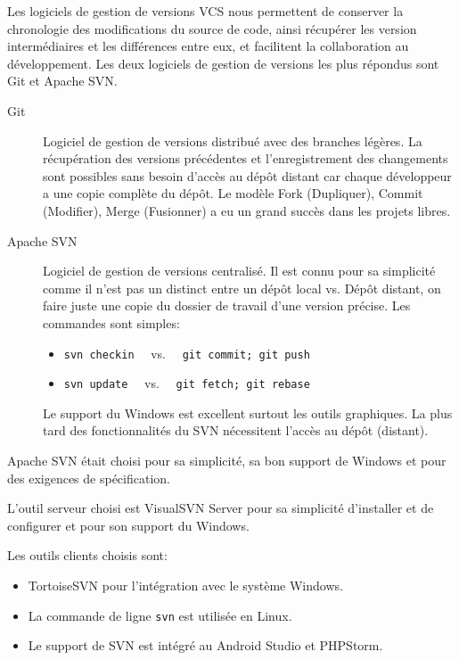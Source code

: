 Les logiciels de gestion de versions \acrshort{VCS} nous permettent de
conserver la chronologie des modifications du source de code, ainsi récupérer
les version intermédiaires et les différences entre eux, et facilitent la
collaboration au développement. Les deux logiciels de gestion de versions les
plus répondus sont Git et Apache SVN\@.

\begin{description}
    \item [Git] Logiciel de gestion de versions distribué avec des branches
        légères. La récupération des versions précédentes et l'enregistrement
        des changements sont possibles sans besoin d'accès au dépôt distant car
        chaque développeur a une copie complète du dépôt. Le modèle Fork
        (Dupliquer), Commit (Modifier), Merge (Fusionner) a eu un grand succès
        dans les projets libres.
    \item [Apache SVN] Logiciel de gestion de versions centralisé. Il est connu
        pour sa simplicité comme il n'est pas un distinct entre un dépôt local
        vs. Dépôt distant, on faire juste une copie du dossier de travail d'une
        version précise. Les commandes sont simples:
        \begin{itemize}
            \item \verb|svn checkin| \ \ vs. \ \ \verb|git commit; git push|
            \item \verb|svn update| \ \ vs. \ \ \verb|git fetch; git rebase|
        \end{itemize}
        Le support du Windows est excellent surtout les outils graphiques. La
        plus tard des fonctionnalités du SVN nécessitent l'accès au dépôt
        (distant).
\end{description}

Apache SVN était choisi pour sa simplicité, sa bon support de Windows et pour
des exigences de spécification.

L'outil serveur choisi est VisualSVN Server pour sa simplicité d'installer et
de configurer et pour son support du Windows.

Les outils clients choisis sont:

\begin{itemize}
    \item TortoiseSVN pour l'intégration avec le système Windows.
    \item La commande de ligne \verb|svn| est utilisée en Linux.
    \item Le support de SVN est intégré au Android Studio et PHPStorm.
\end{itemize}

